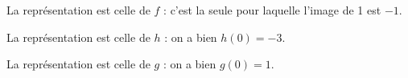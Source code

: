 \begin{enumerate}
La représentation  est celle de $f$ : c'est la seule pour laquelle l'image de 1 est $-1$.

La représentation  est celle de $h$ : on a bien $h(0) = - 3$.

La représentation  est celle de $g$ : on a bien $g(0) = 1$.
\end{enumerate}

\bigskip

